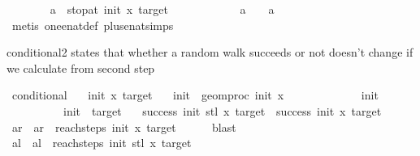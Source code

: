 \begin{isabellebody}
\ \ \ \ \ \ \isamarkupfalse%
\ {\isacartoucheopen}a\ {\isacharequal}{\kern0pt}\ stop{\isacharunderscore}{\kern0pt}at\ init\ x\ target{\isacartoucheclose}\isanewline
\ \ \ \ \ \ \ \ \ \ \ \ {\isacartoucheopen}a{\isacharprime}{\kern0pt}\ {\isacharplus}{\kern0pt}\ {}\ {\isacharequal}{\kern0pt}\ a{\isacartoucheclose}\isanewline
\ \ \ \ \ \ \isamarkupfalse%
\ {\isacharparenleft}{\kern0pt}metis\ one{\isacharunderscore}{\kern0pt}enat{\isacharunderscore}{\kern0pt}def\ plus{\isacharunderscore}{\kern0pt}enat{\isacharunderscore}{\kern0pt}simps{\isacharparenleft}{\kern0pt}{}{\isacharparenright}{\kern0pt}{\isacharparenright}{\kern0pt}\ \isanewline
\ \ \isamarkupfalse%
%
\endisatagproof
{\isafoldproof}%
%
\isadelimproof
%
\endisadelimproof
%
\begin{isamarkuptext}%
conditional2 states that whether a random walk succeeds or not doesn't change if we calculate from second step%
\end{isamarkuptext}\isamarkuptrue%
\isamarkupfalse%
\ conditional{}{\isacharcolon}{\kern0pt}\isanewline
\ \ \ init\ x\ target\isanewline
\ \ \ {\isachardoublequoteopen}init{\isacharprime}{\kern0pt}\ {\isacharequal}{\kern0pt}\ geom{\isacharunderscore}{\kern0pt}proc\ init\ x\ {}{\isachardoublequoteclose}\isanewline
\ \ \ \ \ \ \ \ \ \ {\isachardoublequoteopen}{}\ {\isacharless}{\kern0pt}\ init{\isachardoublequoteclose}\ \isanewline
\ \ \ \ \ \ \ \ \ \ {\isachardoublequoteopen}init\ {\isacharless}{\kern0pt}\ target{\isachardoublequoteclose}\isanewline
\ \ \ {\isachardoublequoteopen}success\ init{\isacharprime}{\kern0pt}\ {\isacharparenleft}{\kern0pt}stl\ x{\isacharparenright}{\kern0pt}\ target\ {\isasymlongleftrightarrow}\ success\ init\ x\ target{\isachardoublequoteclose}\isanewline
%
\isadelimproof
%
\endisadelimproof
%
\isatagproof
{}\isamarkupfalse%
\isanewline
\ \ \isamarkupfalse%
\ ar\ \ {\isachardoublequoteopen}ar\ {\isacharequal}{\kern0pt}\ reach{\isacharunderscore}{\kern0pt}steps\ init\ x\ target{\isachardoublequoteclose}\isanewline
\ \ \ \ \isamarkupfalse%
\ blast\isanewline
\ \ \isamarkupfalse%
\ al\ \ {\isachardoublequoteopen}al\ {\isacharequal}{\kern0pt}\ reach{\isacharunderscore}{\kern0pt}steps\ init{\isacharprime}{\kern0pt}\ {\isacharparenleft}{\kern0pt}stl\ x{\isacharparenright}{\kern0pt}\ target{\isachardoublequoteclose}\isanewline

\end{isabellebody}
